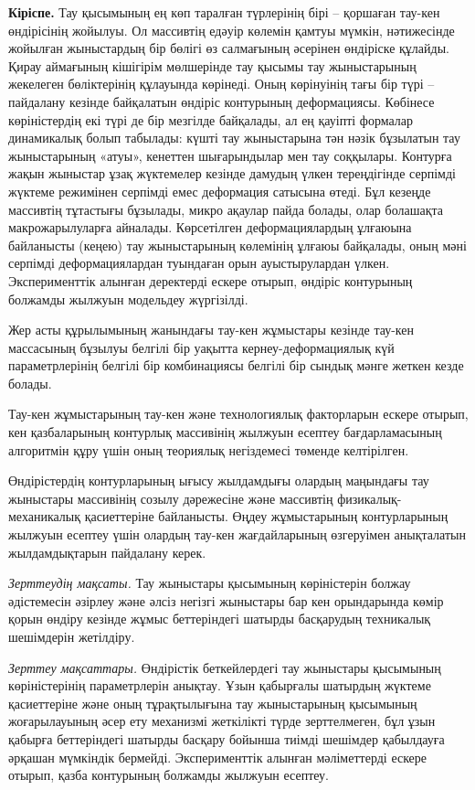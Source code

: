 {\bfseries Кіріспе.} Тау қысымының ең көп таралған түрлерінің бірі --
қоршаған тау-кен өндірісінің жойылуы. Ол массивтің едәуір көлемін қамтуы
мүмкін, нәтижесінде жойылған жыныстардың бір бөлігі өз салмағының
әсерінен өндіріске құлайды. Қирау аймағының кішігірім мөлшерінде тау
қысымы тау жыныстарының жекелеген бөліктерінің құлауында көрінеді. Оның
көрінуінің тағы бір түрі -- пайдалану кезінде байқалатын өндіріс
контурының деформациясы. Көбінесе көріністердің екі түрі де бір мезгілде
байқалады, ал ең қауіпті формалар динамикалық болып табылады: күшті тау
жыныстарына тән нәзік бұзылатын тау жыныстарының «атуы», кенеттен
шығарындылар мен тау соққылары. Контурға жақын жыныстар ұзақ жүктемелер
кезінде дамудың үлкен тереңдігінде серпімді жүктеме режимінен серпімді
емес деформация сатысына өтеді. Бұл кезеңде массивтің тұтастығы
бұзылады, микро ақаулар пайда болады, олар болашақта макрожарылуларға
айналады. Көрсетілген деформациялардың ұлғаюына байланысты (кеңею) тау
жыныстарының көлемінің ұлғаюы байқалады, оның мәні серпімді
деформациялардан туындаған орын ауыстырулардан үлкен. Эксперименттік
алынған деректерді ескере отырып, өндіріс контурының болжамды жылжуын
модельдеу жүргізілді.

Жер асты құрылымының жанындағы тау-кен жұмыстары кезінде тау-кен
массасының бұзылуы белгілі бір уақытта кернеу-деформациялық күй
параметрлерінің белгілі бір комбинациясы белгілі бір сындық мәнге жеткен
кезде болады.

Тау-кен жұмыстарының тау-кен және технологиялық факторларын ескере
отырып, кен қазбаларының контурлық массивінің жылжуын есептеу
бағдарламасының алгоритмін құру үшін оның теориялық негіздемесі төменде
келтірілген.

Өндірістердің контурларының ығысу жылдамдығы олардың маңындағы тау
жыныстары массивінің созылу дәрежесіне және массивтің
физикалық-механикалық қасиеттеріне байланысты. Өңдеу жұмыстарының
контурларының жылжуын есептеу үшін олардың тау-кен жағдайларының
өзгеруімен анықталатын жылдамдықтарын пайдалану керек.

\emph{Зерттеудің мақсаты.} Тау жыныстары қысымының көріністерін болжау
әдістемесін әзірлеу және әлсіз негізгі жыныстары бар кен орындарында
көмір қорын өндіру кезінде жұмыс беттеріндегі шатырды басқарудың
техникалық шешімдерін жетілдіру.

\emph{Зерттеу мақсаттары.} Өндірістік беткейлердегі тау жыныстары
қысымының көріністерінің параметрлерін анықтау. Ұзын қабырғалы шатырдың
жүктеме қасиеттеріне және оның тұрақтылығына тау жыныстарының қысымының
жоғарылауының әсер ету механизмі жеткілікті түрде зерттелмеген, бұл ұзын
қабырға беттеріндегі шатырды басқару бойынша тиімді шешімдер қабылдауға
әрқашан мүмкіндік бермейді. Эксперименттік алынған мәліметтерді ескере
отырып, қазба контурының болжамды жылжуын есептеу.

